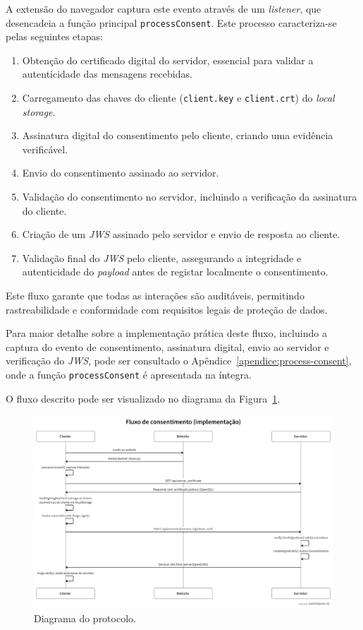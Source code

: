 A extensão do navegador captura este evento através de um \textit{listener}, que desencadeia a função principal \texttt{processConsent}. Este processo caracteriza-se pelas seguintes etapas:
\begin{enumerate}
    \item Obtenção do certificado digital do servidor, essencial para validar a autenticidade das mensagens recebidas.
    \item Carregamento das chaves do cliente (\texttt{client.key} e \texttt{client.crt}) do \textit{local storage}.
    \item Assinatura digital do consentimento pelo cliente, criando uma evidência verificável.
    \item Envio do consentimento assinado ao servidor.
    \item Validação do consentimento no servidor, incluindo a verificação da assinatura do cliente.
    \item Criação de um \textit{JWS} assinado pelo servidor e envio de resposta ao cliente.
    \item Validação final do \textit{JWS} pelo cliente, assegurando a integridade e autenticidade do \textit{payload} antes de registar localmente o consentimento.
\end{enumerate}

Este fluxo garante que todas as interações são auditáveis, permitindo rastreabilidade e conformidade com requisitos legais de proteção de dados.

Para maior detalhe sobre a implementação prática deste fluxo, incluindo a captura do evento de consentimento, assinatura digital, envio ao servidor e verificação do \textit{JWS}, pode ser consultado o Apêndice~\ref{apendice:process-consent}, onde a função \texttt{processConsent} é apresentada na íntegra.

O fluxo descrito pode ser visualizado no diagrama da Figura~\ref{fig:swimlane-solution}.

\begin{figure}[h]
\begin{center}
\includegraphics[width=1\textwidth]{images/swimlanes_solution.png}
\end{center}
\caption{Diagrama do protocolo.}
\label{fig:swimlane-solution}
\end{figure}

